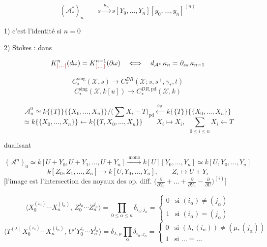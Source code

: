 \documentclass[11pt,a4paper]{article}
\begin{document}
\[
  (\mathcal{A}^{*}_{*})_n\qquad
  s\xrightarrow{\ \kappa_n\ } s[Y_0,\dots,Y_n][y_0,\dots,y_n]^{(n)}
\]

1) c'est l'identité si $n=0$

2) Stokes :  dans



\[
  K^n_{\ill{}}(d\omega)=K^{n-1}_{\ill{}}(\partial\omega)
  \quad\Longleftrightarrow\quad
  d_{\mathcal{A}^*}\,\kappa_n=\partial_{ss}\,\kappa_{n-1}
\]

\[
  C^{\mathrm{sing}}_*(\mathcal{X},s)\longrightarrow
  C^{DR}_*(\mathcal{X};s,s^+,\gamma_*,t)
\]
\[
  C^{\mathrm{sing}}_*(\mathcal{X},k[u])\longrightarrow
  C^{DR,\mathrm{pd}}_*(\mathcal{X},k)
\]

\[
  \mathcal{A}^{0}_n\simeq k\{\{T\}\}\{\{X_0,\dots,X_n\}\}\big/
  \bigl(\textstyle\sum X_i-T\bigr)_{\mathrm{pd}}
  \xleftarrow{\ \text{épi}\ } k\{\{T\}\}\{\{X_0,\dots,X_n\}\}
\]
\[
  \simeq k\{\{X_0,\dots,X_n\}\}
  \longleftarrow k\{\{T,X_0,\dots,X_n\}\}
  \qquad X_i\mapsto X_i,\ \ \textstyle\sum_{0\leqslant i\leqslant n}X_i\leftarrow T
\]

dualisant

\[
  (\mathcal{A}^n)_0\simeq k[U+Y_0,U+Y_1,\dots,U+Y_n]
  \xrightarrow{\ \text{mono}\ } k[U][Y_0,\dots,Y_n]\simeq k[U,Y_0,\dots,Y_n]
\]
\[
  k[Z_0,Z_1,\dots,Z_n]\longrightarrow k[U,Y_0,\dots,Y_n],\qquad
  Z_i\mapsto U+Y_i
\]
[l'image est l'intersection des noyaux des op. diff.
$\bigl(\tfrac{\partial}{\partial Y_0}+\dots+\tfrac{\partial}{\partial Y_n}
-\tfrac{\partial}{\partial U}\bigr)^{(i)}$]

\[
  \bigl\langle X_0^{(i_0)}\cdots X_n^{(i_n)},\,Z_0^{j_0}\cdots Z_n^{j_n}\bigr\rangle
  =\prod_{0\leqslant\alpha\leqslant n}\delta_{i_\alpha,j_\alpha}
  =\begin{cases}0 & \text{si } (i_\alpha)\neq(j_\alpha)\\
  1 & \text{si } (i_\alpha)=(j_\alpha)\end{cases}
\]
\[
  \bigl\langle T^{(\lambda)}X_0^{(i_0)}\cdots X_n^{(i_n)},\,
  U^{\mu}Y_0^{j_0}\cdots Y_n^{j_n}\bigr\rangle
  =\delta_{\lambda,\mu}\prod_\alpha\delta_{i_\alpha,j_\alpha}
  =\begin{cases}0 & \text{si } (\lambda,(i_\alpha))\neq(\mu,(j_\alpha))\\
  1 & \text{si } \dots=\dots\end{cases}
\]
\end{document}
